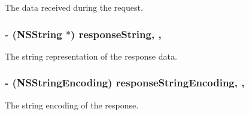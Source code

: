 The data received during the request. \hypertarget{interface_a_f_u_r_l_connection_operation_a152e08b127469e9528f48ff18cb8f383}{
\subsubsection[{response\-String}]{\setlength{\rightskip}{0pt plus 5cm}-\/ (N\-S\-String $\ast$) response\-String\hspace{0.3cm}{\ttfamily [read]}, {\ttfamily [nonatomic]}, {\ttfamily [copy]}}}\label{interface_a_f_u_r_l_connection_operation_a152e08b127469e9528f48ff18cb8f383}
The string representation of the response data. \hypertarget{interface_a_f_u_r_l_connection_operation_a341868219e52e8f1a2a39f012ee6d6a4}{
\subsubsection[{response\-String\-Encoding}]{\setlength{\rightskip}{0pt plus 5cm}-\/ (N\-S\-String\-Encoding) response\-String\-Encoding\hspace{0.3cm}{\ttfamily [read]}, {\ttfamily [nonatomic]}, {\ttfamily [assign]}}}\label{interface_a_f_u_r_l_connection_operation_a341868219e52e8f1a2a39f012ee6d6a4}
The string encoding of the response.


